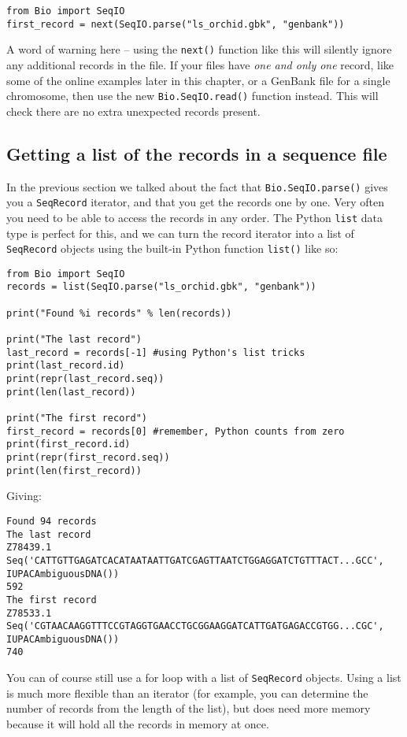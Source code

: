 \begin{verbatim}
from Bio import SeqIO
first_record = next(SeqIO.parse("ls_orchid.gbk", "genbank"))
\end{verbatim}

A word of warning here -- using the \verb|next()| function like this will silently ignore any additional records in the file.
If your files have \textit{one and only one} record, like some of the online examples later in this chapter, or a GenBank file for a single chromosome, then use the new \verb|Bio.SeqIO.read()| function instead.
This will check there are no extra unexpected records present.

\subsection{Getting a list of the records in a sequence file}

In the previous section we talked about the fact that \verb|Bio.SeqIO.parse()| gives you a \verb|SeqRecord| iterator, and that you get the records one by one.  Very often you need to be able to access the records in any order. The Python \verb|list| data type is perfect for this, and we can turn the record iterator into a list of \verb|SeqRecord| objects using the built-in Python function \verb|list()| like so:

\begin{verbatim}
from Bio import SeqIO
records = list(SeqIO.parse("ls_orchid.gbk", "genbank"))

print("Found %i records" % len(records))

print("The last record")
last_record = records[-1] #using Python's list tricks
print(last_record.id)
print(repr(last_record.seq))
print(len(last_record))

print("The first record")
first_record = records[0] #remember, Python counts from zero
print(first_record.id)
print(repr(first_record.seq))
print(len(first_record))
\end{verbatim}

\noindent Giving:

\begin{verbatim}
Found 94 records
The last record
Z78439.1
Seq('CATTGTTGAGATCACATAATAATTGATCGAGTTAATCTGGAGGATCTGTTTACT...GCC', IUPACAmbiguousDNA())
592
The first record
Z78533.1
Seq('CGTAACAAGGTTTCCGTAGGTGAACCTGCGGAAGGATCATTGATGAGACCGTGG...CGC', IUPACAmbiguousDNA())
740
\end{verbatim}

You can of course still use a for loop with a list of \verb|SeqRecord| objects.  Using a list is much more flexible than an iterator (for example, you can determine the number of records from the length of the list), but does need more memory because it will hold all the records in memory at once.

